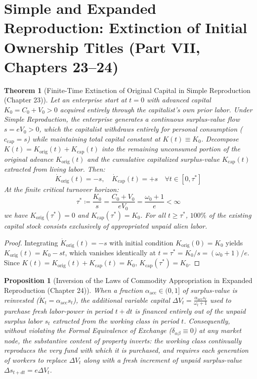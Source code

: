 \documentclass[11pt,a4paper]{article}
\newtheorem{proposition}{Proposition}[section]
\newtheorem{theorem}{Theorem}[section]
\begin{document}
\section{Simple and Expanded Reproduction: Extinction of Initial Ownership Titles (Part VII, Chapters 23--24)}

\begin{theorem}[Finite-Time Extinction of Original Capital in Simple Reproduction (Chapter 23)]
Let an enterprise start at $t = 0$ with advanced capital $K_0 = C_0 + V_0 > 0$ acquired entirely through the capitalist's own prior labor. Under Simple Reproduction, the enterprise generates a continuous surplus-value flow $s = e V_0 > 0$, which the capitalist withdraws entirely for personal consumption ($c_{\text{cap}} = s$) while maintaining total capital constant at $K(t) \equiv K_0$. Decompose $K(t) = K_{\text{orig}}(t) + K_{\text{cap}}(t)$ into the remaining unconsumed portion of the original advance $K_{\text{orig}}(t)$ and the cumulative capitalized surplus-value $K_{\text{cap}}(t)$ extracted from living labor. Then:
\begin{equation}
    \dot{K}_{\text{orig}}(t) = -s, \quad \dot{K}_{\text{cap}}(t) = +s \quad \forall t \in [0, \tau^*]
\end{equation}
At the finite critical turnover horizon:
\begin{equation}
    \tau^* \coloneqq \frac{K_0}{s} = \frac{C_0 + V_0}{e V_0} = \frac{\omega_0 + 1}{e} < \infty
\end{equation}
we have $K_{\text{orig}}(\tau^*) = 0$ and $K_{\text{cap}}(\tau^*) = K_0$. For all $t \ge \tau^*$, $100\%$ of the existing capital stock consists exclusively of appropriated unpaid alien labor.
\end{theorem}

\begin{proof}
Integrating $\dot{K}_{\text{orig}}(t) = -s$ with initial condition $K_{\text{orig}}(0) = K_0$ yields $K_{\text{orig}}(t) = K_0 - s t$, which vanishes identically at $t = \tau^* = K_0 / s = (\omega_0 + 1)/e$. Since $K(t) = K_{\text{orig}}(t) + K_{\text{cap}}(t) = K_0$, $K_{\text{cap}}(\tau^*) = K_0$.
\end{proof}

\begin{proposition}[Inversion of the Laws of Commodity Appropriation in Expanded Reproduction (Chapter 24)]
When a fraction $\alpha_{\text{acc}} \in (0, 1]$ of surplus-value is reinvested ($\dot{K}_t = \alpha_{\text{acc}} s_t$), the additional variable capital $\Delta V_t = \frac{\alpha_{\text{acc}} s_t}{\omega_t + 1}$ used to purchase fresh labor-power in period $t + dt$ is financed entirely out of the unpaid surplus labor $s_t$ extracted from the working class in period $t$. Consequently, without violating the Formal Equivalence of Exchange ($\delta_{\alpha \beta} \equiv 0$) at any market node, the substantive content of property inverts: the working class continually reproduces the very fund with which it is purchased, and requires each generation of workers to replace $\Delta V_t$ along with a fresh increment of unpaid surplus-value $\Delta s_{t+dt} = e \Delta V_t$.
\end{proposition}
\end{document}
